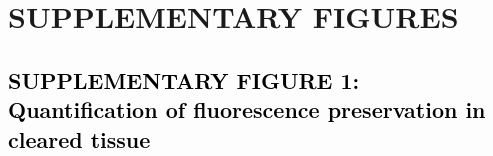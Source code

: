 \documentclass[]{spie}  %
\def\red{\textcolor{black}}
\begin{document}
\pagebreak

\section*{SUPPLEMENTARY FIGURES}


\subsection*{\red{SUPPLEMENTARY FIGURE 1: Quantification of fluorescence preservation in cleared tissue}}
\vspace{-3mm}
\end{document}
